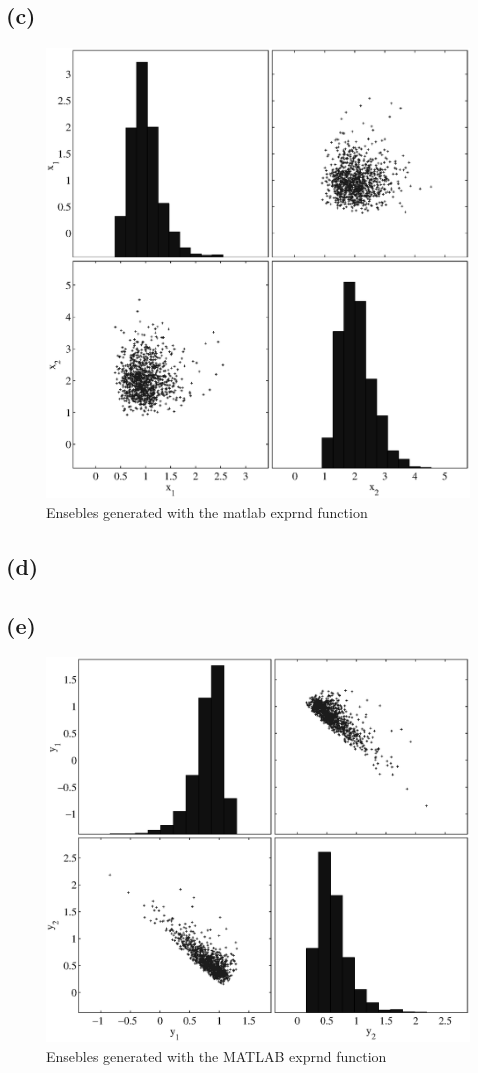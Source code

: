 \documentclass[fleqn, letterpaper]{tufte-handout}
\begin{document}
\subsection{(c)}
\begin{figure}

    \includegraphics[width=\textwidth]{problem2}
    \caption{Ensebles generated with the matlab {\ttfamily exprnd} function}
    \label{norm}
\end{figure}
\subsection{(d)}
\begin{minipage}{\linewidth}

\end{minipage}
\subsection{(e)}
\begin{figure}
    \includegraphics[width=\textwidth]{problem2e}
    \caption{Ensebles generated with the MATLAB {\ttfamily exprnd} function}
    \label{lognorm}
\end{figure}
\end{document}

